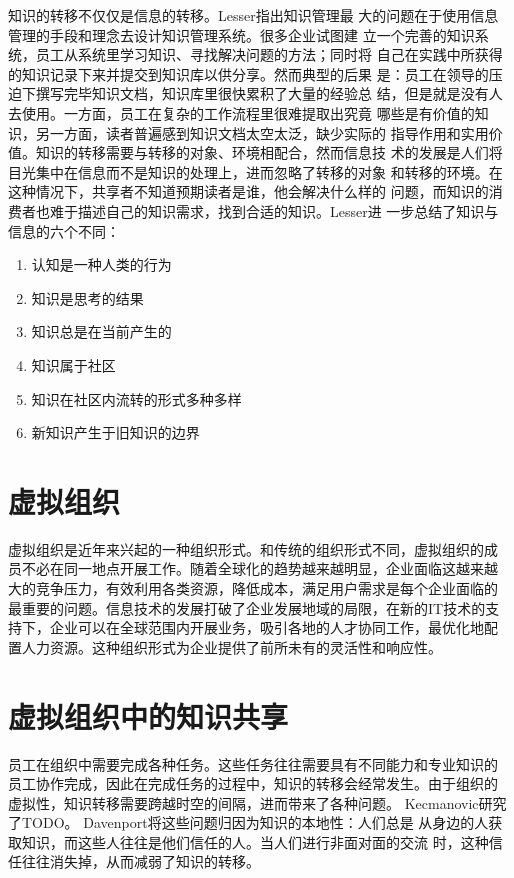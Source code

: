 \documentclass[12pt,a4paper]{ctexart}
\begin{document}
知识的转移不仅仅是信息的转移。Lesser\cite{lesser2000kac}指出知识管理最
大的问题在于使用信息管理的手段和理念去设计知识管理系统。很多企业试图建
立一个完善的知识系统，员工从系统里学习知识、寻找解决问题的方法；同时将
自己在实践中所获得的知识记录下来并提交到知识库以供分享。然而典型的后果
是：员工在领导的压迫下撰写完毕知识文档，知识库里很快累积了大量的经验总
结，但是就是没有人去使用。一方面，员工在复杂的工作流程里很难提取出究竟
哪些是有价值的知识，另一方面，读者普遍感到知识文档太空太泛，缺少实际的
指导作用和实用价值。知识的转移需要与转移的对象、环境相配合，然而信息技
术的发展是人们将目光集中在信息而不是知识的处理上，进而忽略了转移的对象
和转移的环境。在这种情况下，共享者不知道预期读者是谁，他会解决什么样的
问题，而知识的消费者也难于描述自己的知识需求，找到合适的知识。Lesser进
一步总结了知识与信息的六个不同：
\begin{enumerate}
\item 认知是一种人类的行为
\item 知识是思考的结果
\item 知识总是在当前产生的
\item 知识属于社区
\item 知识在社区内流转的形式多种多样
\item 新知识产生于旧知识的边界
\end{enumerate}


\section{虚拟组织}

虚拟组织是近年来兴起的一种组织形式。和传统的组织形式不同，虚拟组织的成
员不必在同一地点开展工作。随着全球化的趋势越来越明显，企业面临这越来越
大的竞争压力，有效利用各类资源，降低成本，满足用户需求是每个企业面临的
最重要的问题。信息技术的发展打破了企业发展地域的局限，在新的IT技术的支
持下，企业可以在全球范围内开展业务，吸引各地的人才协同工作，最优化地配
置人力资源。这种组织形式为企业提供了前所未有的灵活性和响应性。

\section{虚拟组织中的知识共享}
员工在组织中需要完成各种任务。这些任务往往需要具有不同能力和专业知识的
员工协作完成，因此在完成任务的过程中，知识的转移会经常发生。由于组织的
虚拟性，知识转移需要跨越时空的间隔，进而带来了各种问题。
Kecmanovic\cite{cecezkecmanovic2001eap}研究了TODO。
Davenport\cite{davenport1998wko}将这些问题归因为知识的本地性：人们总是
从身边的人获取知识，而这些人往往是他们信任的人。当人们进行非面对面的交流
时，这种信任往往消失掉，从而减弱了知识的转移。
\end{document}
